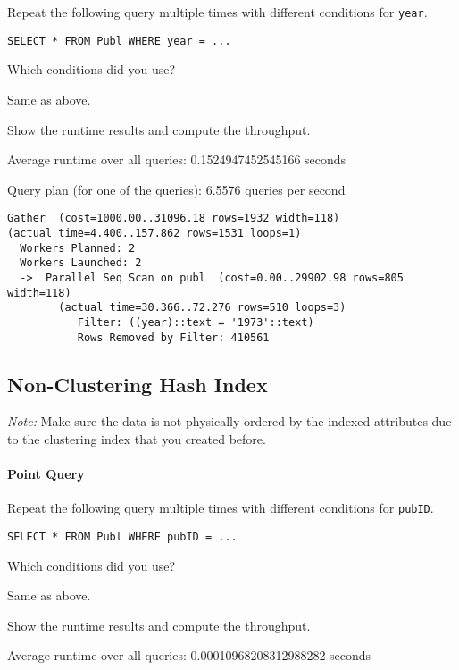 \documentclass[11pt]{scrartcl}
\begin{document}
Repeat the following query multiple times with different conditions for \texttt{year}.

\begin{lstlisting}[style=dbtsql]
SELECT * FROM Publ WHERE year = ...
\end{lstlisting}

Which conditions did you use?

Same as above.

Show the runtime results and compute the throughput.

Average runtime over all queries: 0.1524947452545166 seconds

Query plan (for one of the queries): 6.5576 queries per second

{\small
\parskip0pt\begin{verbatim}
Gather  (cost=1000.00..31096.18 rows=1932 width=118) 
(actual time=4.400..157.862 rows=1531 loops=1)
  Workers Planned: 2
  Workers Launched: 2
  ->  Parallel Seq Scan on publ  (cost=0.00..29902.98 rows=805 width=118) 
        (actual time=30.366..72.276 rows=510 loops=3)
           Filter: ((year)::text = '1973'::text)
           Rows Removed by Filter: 410561
\end{verbatim}}

\subsection*{Non-Clustering Hash Index}

\emph{Note:} Make sure the data is not physically ordered by the indexed attributes due to the clustering index that you created before.

\paragraph{Point Query}

Repeat the following query multiple times with different conditions for \texttt{pubID}.

\begin{lstlisting}[style=dbtsql]
SELECT * FROM Publ WHERE pubID = ...
\end{lstlisting}

Which conditions did you use?

Same as above.

Show the runtime results and compute the throughput.

Average runtime over all queries: 0.00010968208312988282 seconds
\end{document}
